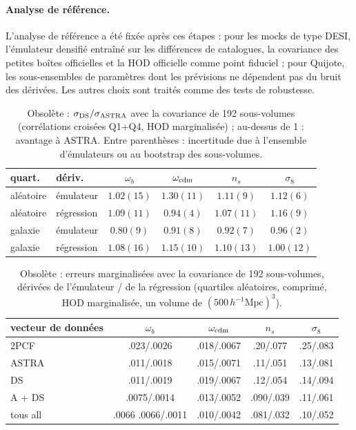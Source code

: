 \documentclass[11pt,twocolumn]{article}
\newcommand{\Mpch}{\,h^{-1}\mathrm{Mpc}}
\begin{document}
\paragraph{Analyse de référence.} L'analyse de référence a été fixée après ces étapes : pour les mocks de type DESI, l'émulateur densifié entraîné sur les différences de catalogues, la covariance des petites boîtes officielles et la HOD officielle comme point fiduciel ; pour Quijote, les sous-ensembles de paramètres dont les prévisions ne dépendent pas du bruit des dérivées. Les autres choix sont traités comme des tests de robustesse.

\begin{table}[!htbp]
\centering\small
\begin{tabular}{llcccc}
\toprule
quart. & dériv. & $\omega_b$ & $\omega_{\rm cdm}$ & $n_s$ & $\sigma_8$ \\
\midrule
aléatoire & émulateur & $1.02(15)$ & $1.30(11)$ & $1.11(9)$ & $1.12(6)$ \\
aléatoire & régression & $1.09(11)$ & $0.94(4)$ & $1.07(11)$ & $1.16(9)$ \\
galaxie & émulateur & $0.80(9)$ & $0.91(8)$ & $0.92(7)$ & $0.96(2)$ \\
galaxie & régression & $1.08(16)$ & $1.15(10)$ & $1.10(13)$ & $1.00(12)$ \\
\bottomrule
\end{tabular}
\caption{Obsolète : $\sigma_{\rm DS}/\sigma_{\rm ASTRA}$ avec la covariance de 192 sous-volumes (corrélations croisées Q1+Q4, HOD marginalisée) ; au-dessus de 1 : avantage à ASTRA. Entre parenthèses : incertitude due à l'ensemble d'émulateurs ou au bootstrap des sous-volumes.}
\label{tab:ratio}
\end{table}

\begin{table}[!htbp]
\centering\small
\begin{tabular}{lcccc}
\toprule
vecteur de données & $\omega_b$ & $\omega_{\rm cdm}$ & $n_s$ & $\sigma_8$ \\
\midrule
2PCF & .023/.0026 & .018/.0067 & .20/.077 & .25/.083 \\
ASTRA & .011/.0018 & .015/.0071 & .11/.051 & .13/.081 \\
DS & .011/.0019 & .019/.0067 & .12/.054 & .14/.094 \\
A + DS & .0075/.0014 & .013/.0052 & .090/.039 & .11/.061 \\
tous all & .0066 .0066/.0011 & .010/.0042 & .081/.032 & .10/.052 \\
\bottomrule
\end{tabular}
\caption{Obsolète : erreurs marginalisées avec la covariance de 192 sous-volumes, dérivées de l'émulateur / de la régression (quartiles aléatoires, comprimé, HOD marginalisée, un volume de $(500\Mpch)^3$).}
\label{tab:sigma_sub}
\end{table}
\end{document}
